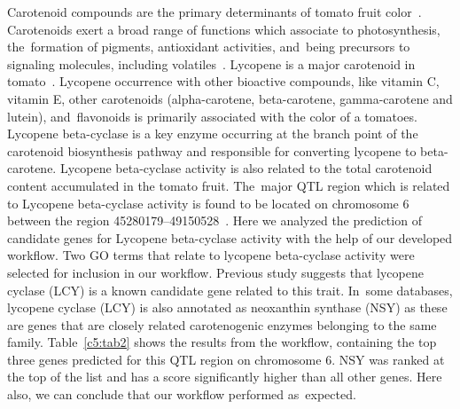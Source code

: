 \documentclass[applsci,article,accept,moreauthors,pdftex]{Definitions/mdpi}
\begin{document}
{Carotenoid compounds are the primary determinants of tomato fruit color~\cite{marti2016tomato}. Carotenoids exert a broad range of functions which associate to photosynthesis, the~formation of pigments, antioxidant activities, and~being precursors to signaling molecules, including volatiles~\cite{giuliano2014plant}. Lycopene is a major carotenoid in tomato~\cite{shi2004antioxidative}.
Lycopene occurrence with other bioactive compounds, like vitamin C, vitamin E, other carotenoids (alpha-carotene, %
beta-carotene, gamma-carotene and lutein), %
and~flavonoids is primarily associated with the color of a tomatoes. Lycopene beta-cyclase is a key enzyme occurring at the branch point of the carotenoid biosynthesis pathway and responsible for converting lycopene to beta-carotene.
Lycopene beta-cyclase activity is also related to the total carotenoid content accumulated in the tomato fruit.
The~major QTL region which is related to Lycopene beta-cyclase activity is found to be located on chromosome 6 %
between the region 45280179--49150528~\cite{cunningham1996functional}. Here we analyzed the prediction of candidate genes for Lycopene beta-cyclase activity with the help of our developed workflow.
Two GO terms %
that relate to lycopene beta-cyclase activity were selected for inclusion in our workflow.
Previous study suggests %
that lycopene cyclase (LCY) is a known candidate gene related to this trait. In~some databases, lycopene cyclase (LCY) is also annotated as neoxanthin synthase (NSY) as these are genes that are closely related carotenogenic enzymes belonging to the same family.
Table~\ref{c5:tab2} shows the results from the workflow, containing the top three genes %
predicted for this QTL region on chromosome 6. %
NSY was ranked at the top of the list and has a score significantly higher than all other genes. Here also, we can conclude that our workflow performed as~expected.

}
\end{document}
